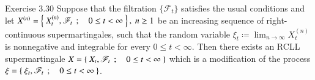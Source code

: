 	\begin{itembox}[l]{Exercise 3.30}
		Suppose that the filtration $\{\mathscr{F}_t\}$ satisfies the usual conditions and let 
		$X^{(n)} = \left\{\ X^{(n)}_t,\mathscr{F}_t\ \, ; \quad 0 \leq t < \infty\ \right\},\ n \geq 1$ be an increasing sequence
		of right-continuous supermartingales, such that the random variable $\xi_t \coloneqq \lim_{n \to \infty} X^{(n)}_t$
		is nonnegative and integrable for every $0 \leq t < \infty$. Then there exists an RCLL supermartingale
		$X = \left\{\ X_t,\mathscr{F}_t\ \, ; \quad 0 \leq t < \infty\ \right\}$ which is a modification of the process 
		$\xi = \left\{\ \xi_t,\mathscr{F}_t\ \, ; \quad 0 \leq t < \infty\ \right\}$.
	\end{itembox}